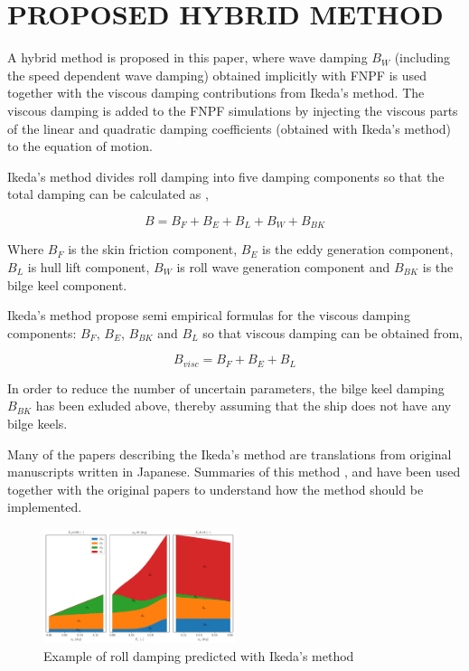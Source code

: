 \section*{PROPOSED HYBRID METHOD}\label{proposed-hybrid-method}

A hybrid method is proposed in this paper, where wave damping $B_W$
(including the speed dependent wave damping) obtained implicitly with
FNPF is used together with the viscous damping contributions from
Ikeda's method. The viscous damping is added to the FNPF simulations by
injecting the viscous parts of the linear and quadratic damping
coefficients (obtained with Ikeda's method) to the equation of motion.

Ikeda's method divides roll damping into five damping components so that
the total damping can be calculated as \citep{7505983/937PN5DT},

\begin{equation}
B = B_F + B_E + B_L + B_W + B_{BK}
\end{equation}

Where $B_F$ is the skin friction component, $B_E$ is the eddy
generation component, $B_L$ is hull lift component, $B_W$ is roll
wave generation component and $B_{BK}$ is the bilge keel component.

Ikeda's method propose semi empirical formulas for the viscous damping
components: $B_F$, $B_E$, $B_{BK}$ and $B_L$ so that viscous
damping can be obtained from,

\begin{equation}
\label{eq:viscous damping}
B_{visc} = B_F + B_E + B_L
\end{equation}

In order to reduce the number of uncertain parameters, the bilge keel
damping $B_{BK}$ has been exluded above, thereby assuming that the
ship does not have any bilge keels.

Many of the papers describing the Ikeda's method are translations from
original manuscripts written in Japanese. Summaries of this method
\citep{7505983/FB64RGPF}, \citep{7505983/KAKIM2E2} and
\citep{7505983/UGK6YEVD} have been used together with the original papers
to understand how the method should be implemented.
\citep{7505983/UGK6YEVD}

    

    
    \begin{figure}[H]
        \begin{center}\includegraphics[width = 0.5\textwidth]{figures/ikeda_generic.pdf}\end{center}
        \vspace{-1cm}
        \caption{Example of roll damping predicted with Ikeda's method}
        \label{fig:ikeda_generic}
    \end{figure}
    
